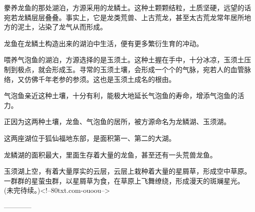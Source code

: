 \begin{this_body}
豢养龙鱼的那处湖泊，方源采用的龙鳞土。这种土颗颗结粒，土质坚硬，远望的话宛若龙鳞层层叠叠。事实上，它是龙类荒兽、上古荒龙，甚至太古荒龙常年居所地方的泥土，沾染了龙气从而形成。

龙鱼在龙鳞土构造出来的湖泊中生活，便有更多繁衍生育的冲动。

喂养气泡鱼的湖泊，方源选择的是玉须土。这种土握在手中，十分冰凉，玉须土压制到极点，就会形成玉。寻常的玉须土壤，会形成一个个的气脉，宛若人的血管脉络，又仿佛千年老参的参须。这也是玉须土成名的根由。

气泡鱼亲近这种土壤，十分有利，能极大地延长气泡鱼的寿命，增添气泡鱼的活力。

正因为这两种土壤，龙鱼、气泡鱼的居所，被方源命名为龙鳞湖、玉须湖。

这两座湖位于狐仙福地东部，是面积第一、第二的大湖。

龙鳞湖的面积最大，里面生存着大量的龙鱼，甚至还有一头荒兽龙鱼。

玉须湖上空，有着大量厚实的云层，云层上栽种着大量的星屑草，形成空中草原。一群群的星萤虫群，以星屑草为食，在草原上飞舞缭绕，形成漫天的斑斓星光。(未完待续。)<!--80txt.com-ouoou-->

------------

\end{this_body}


